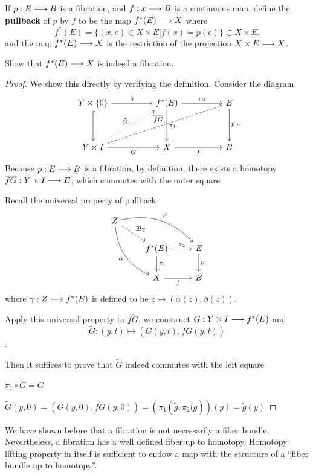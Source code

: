 \documentclass[11pt]{book} %
\begin{document}
\begin{definition}
If $p: E\longrightarrow B$ is a fibration, and $f: x\longrightarrow B$ is a continuous map, define the \textbf{pullback} of $p$ by $f$ to be the map $f^{*}(E)\longrightarrow X$ where
$$
f^*(E)=\{(x,e)\in X\times E|f(x)=p(e)\}\subset X\times E.
$$
and the map $f^*(E)\longrightarrow X$ is the restriction of the projection $X\times E\longrightarrow X$.
\end{definition}
\begin{exr}
Show that $f^*(E)\longrightarrow X$ is indeed a fibration.
\end{exr}
\begin{proof}
We show this directly by verifying the definition. Consider the diagram
$$
\begin{tikzcd}
Y\times \{0\} \arrow[dd, hook] \arrow[rr, "\tilde{g}"] &  & f^{*}(E) \arrow[rr, "\pi_2"] \arrow[dd, "\pi_1"] &  & E \arrow[dd, "p"] \\
 &  &  &  &  \\
Y\times I \arrow[rr, "G"'] \arrow[rrrruu, "\overline{fG}", dashed] \arrow[rruu, "\tilde{G}", dotted] &  & X \arrow[rr, "f"'] &  & B
\end{tikzcd}.
$$
Because $p: E\longrightarrow B$ is a fibration, by definition, there exists a homotopy $\overline{fG}: Y\times I\longrightarrow E$, which commutes with the outer square.

Recall the universal property of pullback
$$
\begin{tikzcd}
Z \arrow[rdd, "\alpha"', bend right] \arrow[rrd, "\beta", bend left] \arrow[rd, "\exists !\gamma", dashed] &  &  \\
 & f^{*}(E) \arrow[r, "\pi_2"] \arrow[d, "\pi_1"] & E \arrow[d, "p"] \\
 & X \arrow[r, "f"'] & B
\end{tikzcd}
$$
where $\gamma: Z\longrightarrow f^*(E)$ is defined to be 
$z\mapsto (\alpha(z), \beta(z))$. 

Apply this universal property to $\overline{f G}$, we construct $\tilde{G}: Y\times I\longrightarrow f^*(E)$ and
$$
\tilde{G}: (y,t)\mapsto (G(y,t),\overline{fG}(y,t))
$$.

Then it suffices to prove that $\tilde{G}$ indeed commutes with the left square

$\pi_1\circ \tilde{G}=G$\checkmark 

$\tilde{G}(y,0)=(G(y,0),\overline{fG}(y,0))=(\pi_1(\tilde{g},\pi_2\tilde(g))(y)=\tilde{g}(y)$\checkmark
\end{proof}


We have shown before that a fibration is not necessarily a fiber bundle. Nevertheless, a fibration has a well defined fiber up to homotopy. Homotopy lifting property in itself is sufficient to endow a map with the structure of a ``fiber bundle up to homotopy''.
\end{document}

